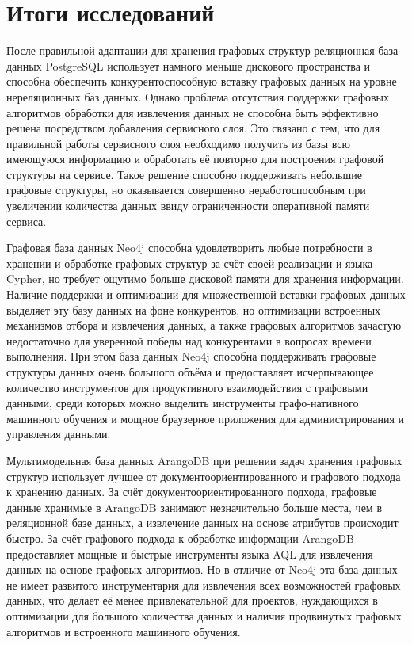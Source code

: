 \section{Итоги исследований}

После правильной адаптации для хранения графовых структур реляционная база данных PostgreSQL использует намного меньше дискового пространства
и способна обеспечить конкурентоспособную вставку графовых данных на уровне нереляционных баз данных. Однако проблема отсутствия поддержки
графовых алгоритмов обработки для извлечения данных не способна быть эффективно решена посредством добавления сервисного слоя. Это связано
с тем, что для правильной работы сервисного слоя необходимо получить из базы всю имеющуюся информацию и обработать её повторно для построения
графовой структуры на сервисе. Такое решение способно поддерживать небольшие графовые структуры, но оказывается совершенно неработоспособным
при увеличении количества данных ввиду ограниченности оперативной памяти сервиса.

Графовая база данных Neo4j способна удовлетворить любые потребности в хранении и обработке графовых структур за счёт своей реализации и языка
Cypher, но требует ощутимо больше дисковой памяти для хранения информации. Наличие поддержки и оптимизации для множественной вставки графовых
данных выделяет эту базу данных на фоне конкурентов, но оптимизации встроенных механизмов отбора и извлечения данных, а также графовых
алгоритмов зачастую недостаточно для уверенной победы над конкурентами в вопросах времени выполнения. При этом база данных Neo4j способна
поддерживать графовые структуры данных очень большого объёма и предоставляет исчерпывающее количество инструментов для продуктивного
взаимодействия с графовыми данными, среди которых можно выделить инструменты графо-нативного машинного обучения и мощное браузерное
приложения для администрирования и управления данными.

Мультимодельная база данных ArangoDB при решении задач хранения графовых структур использует лучшее от документоориентированного и графового
подхода к хранению данных. За счёт документоориентированного подхода, графовые данные хранимые в ArangoDB занимают незначительно больше места,
чем в реляционной базе данных, а извлечение данных на основе атрибутов происходит быстро. За счёт графового подхода к обработке информации
ArangoDB предоставляет мощные и быстрые инструменты языка AQL для извлечения данных на основе графовых алгоритмов. Но в отличие от Neo4j эта
база данных не имеет развитого инструментария для извлечения всех возможностей графовых данных, что делает её менее привлекательной для
проектов, нуждающихся в оптимизации для большого количества данных и наличия продвинутых графовых алгоритмов и встроенного машинного обучения.

%
